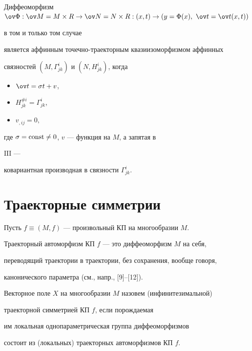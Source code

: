  


\begin{thm} 


Диффеоморфизм $\ov\Phi:\ov M=M\times R\to\ov N=N\times 


R:(x,t)\to(y=\Phi(x),\ \ov t=\ov t(x,t))$ 


в том и только том случае 


является аффинным точечно-траекторным квазиизоморфизмом аффинных 


связностей $(M,\Gamma^i_{j k})$ и $(N,H^i_{j k})$, когда 


\begin{itemize} 


\item[I.] $\ov t=\sigma t+v$, 


\item[II.] $H^{\# i}_{j k}=\Gamma^i_{j k}$, 


\item[III.] $v_{,i j}=0,$ 


\end{itemize} 


где $\sigma=\operatorname{const}\ne0$, $v$ --- функция на $M$, а запятая в 


$\mathrm{III}$ --- 


ковариантная производная в связности $\Gamma^i_{j k}$. 


\end{thm} 


 


\section{Траекторные симметрии} 


 


Пусть $f\equiv(M,f)$ --- произвольный КП на многообразии $M$. 


Траекторный автоморфизм КП $f$ --- это диффеоморфизм $M$ на себя, 


переводящий траектории в траектории, без сохранения, вообще говоря, 


канонического параметра (см., напр., [9]--[12]). 


 


\begin{defn} 


Векторное поле $X$ на многообразии $M$ назовем (инфинитезимальной) 


траекторной симметрией КП $f$, если порождаемая 


им локальная однопараметрическая группа диффеоморфизмов 


состоит из (локальных) траекторных автоморфизмов КП $f$. 


\end{defn} 



